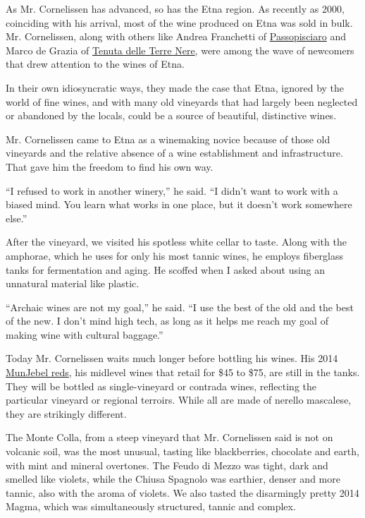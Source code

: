 As Mr. Cornelissen has advanced, so has the Etna region. As recently as
2000, coinciding with his arrival, most of the wine produced on Etna was
sold in bulk. Mr. Cornelissen, along with others like Andrea Franchetti
of \href{http://www.passopisciaro.com/home/}{Passopisciaro} and Marco de
Grazia of \href{http://www.tenutaterrenere.com/en/}{Tenuta delle Terre
Nere}, were among the wave of newcomers that drew attention to the wines
of Etna.

In their own idiosyncratic ways, they made the case that Etna, ignored
by the world of fine wines, and with many old vineyards that had largely
been neglected or abandoned by the locals, could be a source of
beautiful, distinctive wines.

Mr. Cornelissen came to Etna as a winemaking novice because of those old
vineyards and the relative absence of a wine establishment and
infrastructure. That gave him the freedom to find his own way.

``I refused to work in another winery,'' he said. ``I didn't want to
work with a biased mind. You learn what works in one place, but it
doesn't work somewhere else.''

After the vineyard, we visited his spotless white cellar to taste. Along
with the amphorae, which he uses for only his most tannic wines, he
employs fiberglass tanks for fermentation and aging. He scoffed when I
asked about using an unnatural material like plastic.

``Archaic wines are not my goal,'' he said. ``I use the best of the old
and the best of the new. I don't mind high tech, as long as it helps me
reach my goal of making wine with cultural baggage.''

Today Mr. Cornelissen waits much longer before bottling his wines. His
2014 \href{http://www.frankcornelissen.it/eng_production.htm}{MunJebel
reds}, his midlevel wines that retail for \$45 to \$75, are still in the
tanks. They will be bottled as single-vineyard or contrada wines,
reflecting the particular vineyard or regional terroirs. While all are
made of nerello mascalese, they are strikingly different.

The Monte Colla, from a steep vineyard that Mr. Cornelissen said is not
on volcanic soil, was the most unusual, tasting like blackberries,
chocolate and earth, with mint and mineral overtones. The Feudo di Mezzo
was tight, dark and smelled like violets, while the Chiusa Spagnolo was
earthier, denser and more tannic, also with the aroma of violets. We
also tasted the disarmingly pretty 2014 Magma, which was simultaneously
structured, tannic and complex.

